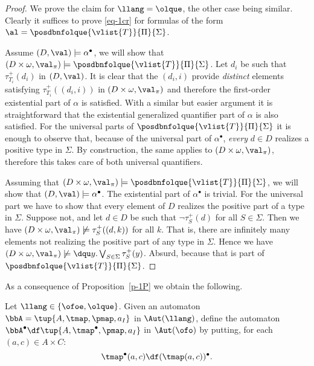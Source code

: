 \begin{proof}
We prove the claim for $\llang={\olque}$, the other case being similar.
Clearly it suffices to prove \eqref{eq-1cr} for formulas of the form
$\al = \posdbnfolque{\vlist{T}}{\Pi}{\Sigma}$.
\smallskip

\noindent\fbox{$\Rightarrow$} 
Assume $(D,\val) \models \alpha^{\bullet}$, we will show that 
$(D\times \omega,\val_\pi) \models \posdbnfolque{\vlist{T}}{\Pi}{\Sigma}$.
Let $d_i$ be such that $\tau_{T_i}^+(d_i)$ in $(D,\val)$. 
It is clear that the $(d_i,i)$ provide \emph{distinct} elements satisfying 
$\tau_{T_i}^+((d_i,i))$ in $(D\times\omega,\val_{\pi})$ and therefore the 
first-order existential part of $\alpha$ is satisfied. 
With a similar but easier argument it is straightforward that the existential 
generalized quantifier part of $\alpha$ is also satisfied.
For the universal parts of $\posdbnfolque{\vlist{T}}{\Pi}{\Sigma}$ it is enough
to observe that, because of the universal part of $\alpha^\bullet$, \emph{every}
$d\in D$ realizes a positive type in $\Sigma$. 
By construction, the same applies to $(D\times\omega,\val_{\pi})$, 
therefore this takes care of both universal quantifiers.
\medskip
		
\noindent\fbox{$\Leftarrow$} 
Assuming that $(D\times \omega,\val_\pi) \models 
\posdbnfolque{\vlist{T}}{\Pi}{\Sigma}$,
we will show that $(D,\val) \models \alpha^\bullet$. 
The existential part of $\alpha^{\bullet}$ is trivial. 
For the universal part we have to show that every element of $D$ realizes the 
positive part of a type in $\Sigma$. 
Suppose not, and let $d\in D$ be such that $\lnot\tau_S^+(d)$ for all $S\in 
\Sigma$. 
Then we have $(D\times\omega,\val_\pi) \not\models \tau_S^+((d,k))$ for all $k$.
That is, there are infinitely many elements not realizing the positive part of 
any type in $\Sigma$. 
Hence we have $(D\times\omega,\val_\pi) \not\models \dqu y.\bigvee_{S\in\Sigma} 
\tau_S^+(y)$. 
Absurd, because that is part of $\posdbnfolque{\vlist{T}}{\Pi}{\Sigma}$.
\end{proof}

As a consequence of Proposition~\ref{p-1P} we obtain the following.

\begin{definition}
Let $\llang\in \{{\ofoe},{\olque}\}$.
Given an automaton $\bbA = \tup{A,\tmap,\pmap,a_{I}}$ in $\Aut(\llang)$, define 
the automaton $\bbA^{\bullet} \df \tup{A,\tmap^{\bullet},\pmap,a_{I}}$ in 
$\Aut(\ofo)$ by putting, for each $(a,c) \in A \times C$:
\[
\tmap^{\bullet}(a,c) \df (\tmap(a,c))^{\bullet}.
\]
\end{definition}

